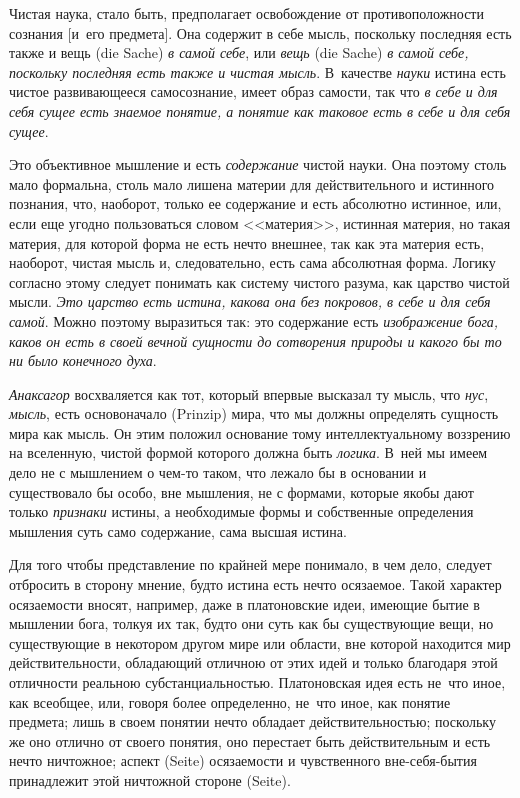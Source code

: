 Чистая наука, стало быть, предполагает освобождение от противоположности
сознания [и~его предмета]. Она содержит в себе мысль, поскольку последняя
есть также и вещь (die Sache) {\em в самой себе}, или
{\em вещь} (die Sache) {\em в самой себе, поскольку последняя есть также
и чистая мысль}. В~качестве {\em науки} истина есть чистое развивающееся
самосознание, имеет образ самости, так что {\em в себе и для себя сущее
есть знаемое понятие, а понятие как таковое есть в себе и для себя сущее}.

Это объективное мышление и есть {\em содержание} чистой
науки. Она поэтому столь мало формальна, столь мало лишена материи для
действительного и истинного познания, что, наоборот, только ее содержание и
есть абсолютно истинное, или, если еще угодно пользоваться словом
<<материя>>, истинная материя, но такая материя, для которой форма не есть
нечто внешнее, так как эта материя есть, наоборот, чистая мысль и,
следовательно, есть сама абсолютная форма. Логику согласно этому следует
понимать как систему чистого разума, как царство чистой мысли.
{\em Это царство есть истина, какова она без покровов,
в себе и для себя самой}. Можно поэтому выразиться так: это содержание есть
{\em изображение бога, каков он есть в своей вечной
сущности до сотворения природы и какого бы то ни было конечного духа}.

{\em Анаксагор} восхваляется как тот, который впервые
высказал ту мысль, что {\em нус},
{\em мысль}, есть основоначало (Prinzip) мира, что мы
должны определять сущность мира как мысль. Он этим положил основание тому
интеллектуальному воззрению на вселенную, чистой формой которого должна
быть {\em логика}. В~ней мы имеем дело не с мышлением о
чем-то таком, что лежало бы в основании и существовало бы особо, вне
мышления, не с формами, которые якобы дают только
{\em признаки} истины, а необходимые формы и
собственные определения мышления суть само содержание, сама высшая истина.

Для того чтобы представление по крайней мере понимало, в чем дело, следует
отбросить в сторону мнение, будто истина есть нечто осязаемое. Такой
характер осязаемости вносят, например, даже в платоновские идеи, имеющие
бытие в мышлении бога, толкуя их так, будто они суть как бы существующие
вещи, но существующие в некотором другом мире или области, вне которой
находится мир действительности, обладающий отличною от этих идей и только
благодаря этой отличности реальною субстанциальностью. Платоновская идея
есть не~что иное, как всеобщее, или, говоря более определенно, не~что иное,
как понятие предмета; лишь в своем понятии нечто обладает
действительностью; поскольку же оно отлично от своего понятия, оно
перестает быть действительным и есть нечто ничтожное; аспект (Seite)
осязаемости и чувственного вне-себя-бытия принадлежит этой ничтожной
стороне (Seite).

